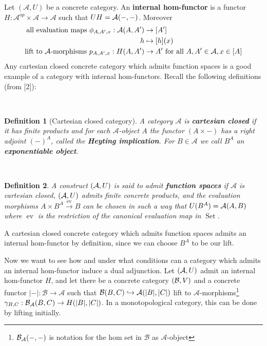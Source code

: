 \documentclass[12pt,a4paper]{article}
\newtheorem{definition}{Definition}[section] %
\DeclareMathOperator{\Set}{Set}
\DeclareMathOperator{\ev}{ev}
\def\HomA{\ensuremath\mathcal{A}}
\def\HomB{\ensuremath\mathcal{B}}
\def\concA{\ensuremath(\mathcal{A},U)}
\def\concB{\ensuremath(\mathcal{B},V)}
\begin{document}
Let $(\mathcal{A}, U)$ be a concrete category. An \textbf{internal hom-functor} is a functor $H: \mathcal{A}^{op} \times \mathcal{A} \to \mathcal{A}$ such that $UH = \HomA(-,-)$. Moreover \begin{align*}
	\text{all evaluation maps } \phi_{A,A',x}: \HomA(A,A') &\to [A']\\
	h &\mapsto [h](x)\\
	\text{lift to $\mathcal{A}$-morphisms } p_{A,A',x}: H(A,A') &\to A' \text{ for all } A, A' \in \mathcal{A}, x \in [A]
\end{align*}
Any cartesian closed concrete category which admits function spaces is a good example of a category with internal hom-functors. Recall the following definitions (from [2]):

\
\begin{definition}[Cartesian closed category] A category $\mathcal{A}$ is \textbf{cartesian closed} if it has finite products and for each $\mathcal{A}$-object $A$ the functor $(A \times -)$ has a right adjoint  $(-)^A$, called the \textbf{Heyting implication}. For $B \in \mathcal{A}$ we call $B^A$ an \textbf{exponentiable object}. 
\end{definition}
\

\begin{definition}
	A construct $ \concA$ is said to admit \textbf{function spaces} if $\mathcal{A}$ is cartesian closed, $\concA$ admits finite concrete products, and the evaluation morphisms $A \times B^A \stackrel{\ev}{\to} B$ can be chosen in such a way that $U(B^A)= \HomA(A,B)$ where $\ev$ is the restriction of the canonical evaluation map in $\Set$.  \end{definition}

A cartesian closed concrete category which admits function spaces admits an internal hom-functor by definition, since we can choose $B^A$ to be our lift.

 
Now we want to see how and under what conditions can  a category which admits an internal hom-functor  induce a dual adjunction. Let $\concA$ admit an internal hom-functor $H$, and let there be a concrete category $\concB$ and a concrete functor $\lvert - \lvert : \mathcal{B} \to \mathcal{A}$ such that $\HomB(B, C) \hookrightarrow \HomA(\lvert B \lvert, \lvert C \lvert)$ lift to $\mathcal{A}$-morphisms\footnote{$\HomB_\mathcal{A}(-,-)$ is notation for the hom set in $\mathcal{B}$ as $\mathcal{A}$-object} $\gamma_{B,C}: \HomB_\mathcal{A}(B,C) \to H(\lvert B \lvert, \lvert C\lvert)$.  In a monotopological category, this can be done by lifting initially.
\end{document}
